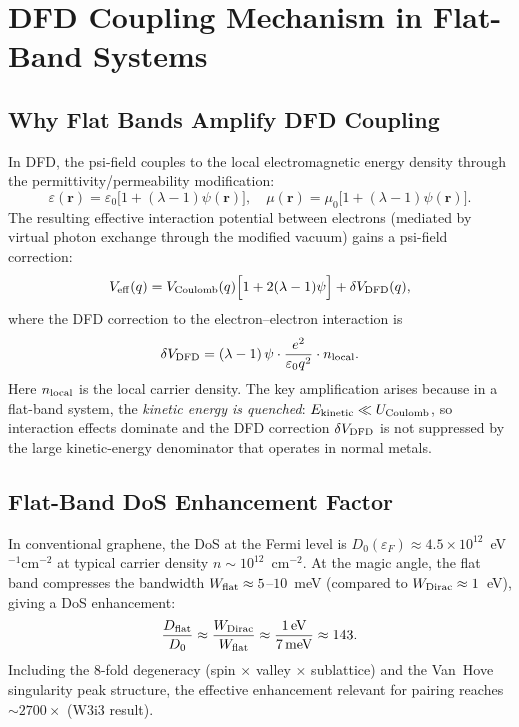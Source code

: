 \documentclass[11pt]{article}
\newcommand{\ee}[1]{\times 10^{#1}}
\newcommand{\psifield}{\psi}
\newcommand{\VDFD}{\delta V_{\rm DFD}}
\begin{document}
\section{DFD Coupling Mechanism in Flat-Band Systems}
\label{sec:mechanism}

\subsection{Why Flat Bands Amplify DFD Coupling}

In DFD, the psi-field couples to the local electromagnetic energy density
through the permittivity/permeability modification:
\begin{equation}
  \varepsilon(\mathbf{r}) = \varepsilon_0\bigl[1 + (\lambda-1)\psifield(\mathbf{r})\bigr],
  \quad
  \mu(\mathbf{r}) = \mu_0\bigl[1 + (\lambda-1)\psifield(\mathbf{r})\bigr].
  \label{eq:psi_eps_mu}
\end{equation}
The resulting effective interaction potential between electrons (mediated by
virtual photon exchange through the modified vacuum) gains a psi-field
correction:
\begin{equation}
  V_{\rm eff}(q) = V_{\rm Coulomb}(q)\Bigl[1 + 2(\lambda-1)\psifield\Bigr]
                    + \VDFD(q),
  \label{eq:Veff}
\end{equation}
where the DFD correction to the electron--electron interaction is
\begin{equation}
  \VDFD = (\lambda-1)\,\psifield \cdot \frac{e^2}{\varepsilon_0 q^2}
         \cdot n_{\rm local}.
  \label{eq:VDFD}
\end{equation}
Here $n_{\rm local}$ is the local carrier density. The key amplification
arises because in a flat-band system, the \emph{kinetic energy is
quenched}: $E_{\rm kinetic} \ll U_{\rm Coulomb}$, so interaction effects
dominate and the DFD correction $\VDFD$ is not suppressed by the large
kinetic-energy denominator that operates in normal metals.

\subsection{Flat-Band DoS Enhancement Factor}

In conventional graphene, the DoS at the Fermi level is
$D_0(\varepsilon_F) \approx 4.5\ee{12}$~eV$^{-1}$cm$^{-2}$ at typical
carrier density $n \sim 10^{12}$~cm$^{-2}$. At the magic angle, the flat
band compresses the bandwidth $W_{\rm flat} \approx 5$--$10$~meV (compared
to $W_{\rm Dirac} \approx 1$~eV), giving a DoS enhancement:
\begin{equation}
  \frac{D_{\rm flat}}{D_0} \approx \frac{W_{\rm Dirac}}{W_{\rm flat}}
    \approx \frac{1\,\text{eV}}{7\,\text{meV}} \approx 143.
  \label{eq:DOS_enhancement}
\end{equation}
Including the 8-fold degeneracy (spin $\times$ valley $\times$ sublattice)
and the Van~Hove singularity peak structure, the effective enhancement
relevant for pairing reaches $\sim 2700\times$ (W3i3 result).
\end{document}
